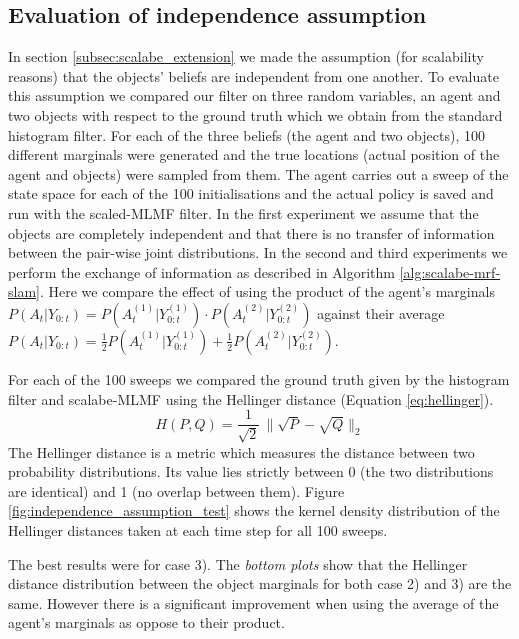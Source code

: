 \documentclass[review]{elsarticle}
\numberwithin{equation}{section}
\begin{document}
\subsection{Evaluation of independence assumption}\label{subsec:eval_indep_assumptiom}

In section \ref{subsec:scalabe_extension} we made the assumption (for scalability reasons) that the objects' beliefs are independent
from one another. To evaluate this assumption we compared our filter on three random variables, an agent and two objects with respect to the ground truth
which we obtain from the standard histogram filter. For each of the three beliefs (the agent and two objects), 100 different marginals 
were generated and the true locations (actual position of the agent and objects) were sampled from them. 
The agent carries out  a sweep of the state space for each of the 100 initialisations and the actual policy is saved 
and run with the scaled-MLMF filter. In the first experiment we assume that the objects are completely independent 
and that there is no transfer of information between the pair-wise joint distributions. In the second and third experiments we perform the exchange of information as 
described in Algorithm \ref{alg:scalabe-mrf-slam}. Here we compare the effect of using the product of the agent's marginals $P(A_t|Y_{0:t}) = P(A^{(1)}_t|Y^{(1)}_{0:t}) \cdot P(A^{(2)}_t|Y^{(2)}_{0:t})$ 
against their average $P(A_t|Y_{0:t}) = \frac{1}{2}P(A^{(1)}_t|Y^{(1)}_{0:t}) + \frac{1}{2}P(A^{(2)}_t|Y^{(2)}_{0:t})$. 

For each of the 100 sweeps we compared the ground truth given by the histogram filter and scalabe-MLMF using the Hellinger distance (Equation \ref{eq:hellinger}).
\begin{equation} \label{eq:hellinger}
 H(P,Q) = \frac{1}{\sqrt{2}}\, \|\sqrt{P} - \sqrt{Q}\|_2  
\end{equation}
The Hellinger distance is a metric which measures the distance between two probability distributions. Its value lies strictly between 0 (the two 
distributions are identical) and 1 (no overlap between them). Figure \ref{fig:independence_assumption_test} shows the kernel density 
distribution of the Hellinger distances taken at each time step for all 100 sweeps.

The best results were for case 3). The \textit{bottom plots} show that the Hellinger distance distribution between the
object marginals for both case 2) and 3) are the same. However there is a significant improvement when using the average of the agent's marginals as oppose to 
their product. 
\end{document}
